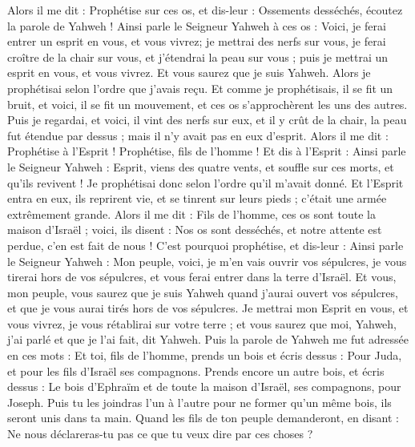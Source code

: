 \begin{multicols}{2}
Alors il me dit : Prophétise sur ces os, et dis-leur : Ossements desséchés, écoutez la parole de Yahweh !
Ainsi parle le Seigneur Yahweh à ces os : Voici, je ferai entrer un esprit en vous, et vous vivrez;
je mettrai des nerfs sur vous, je ferai croître de la chair sur vous, et j'étendrai la peau sur vous ; puis je mettrai un esprit en vous, et vous vivrez. Et vous saurez que je suis Yahweh.
Alors je prophétisai selon l'ordre que j'avais reçu. Et comme je prophétisais, il se fit un bruit, et voici, il se fit un mouvement, et ces os s'approchèrent les uns des autres.
Puis je regardai, et voici, il vint des nerfs sur eux, et il y crût de la chair, la peau fut étendue par dessus ; mais il n'y avait pas en eux d'esprit.
Alors il me dit : Prophétise à l'Esprit ! Prophétise, fils de l'homme ! Et dis à l'Esprit : Ainsi parle le Seigneur Yahweh : Esprit, viens des quatre vents, et souffle sur ces morts, et qu'ils revivent !
Je prophétisai donc selon l'ordre qu'il m'avait donné. Et l'Esprit entra en eux, ils reprirent vie, et se tinrent sur leurs pieds ; c'était une armée extrêmement grande.
Alors il me dit : Fils de l'homme, ces os sont toute la maison d'Israël ; voici, ils disent : Nos os sont desséchés, et notre attente est perdue, c'en est fait de nous !
C'est pourquoi prophétise, et dis-leur : Ainsi parle le Seigneur Yahweh : Mon peuple, voici, je m'en vais ouvrir vos sépulcres, je vous tirerai hors de vos sépulcres, et vous ferai entrer dans la terre d'Israël.
Et vous, mon peuple, vous saurez que je suis Yahweh quand j'aurai ouvert vos sépulcres, et que je vous aurai tirés hors de vos sépulcres.
Je mettrai mon Esprit en vous, et vous vivrez, je vous rétablirai sur votre terre ; et vous saurez que moi, Yahweh, j'ai parlé et que je l'ai fait, dit Yahweh.
Puis la parole de Yahweh me fut adressée en ces mots :
Et toi, fils de l'homme, prends un bois et écris dessus : Pour Juda, et pour les fils d'Israël ses compagnons. Prends encore un autre bois, et écris dessus : Le bois d'Ephraïm et de toute la maison d'Israël, ses compagnons, pour Joseph.
Puis tu les joindras l'un à l'autre pour ne former qu'un même bois, ils seront unis dans ta main.
Quand les fils de ton peuple demanderont, en disant : Ne nous déclareras-tu pas ce que tu veux dire par ces choses ?

\end{multicols}
